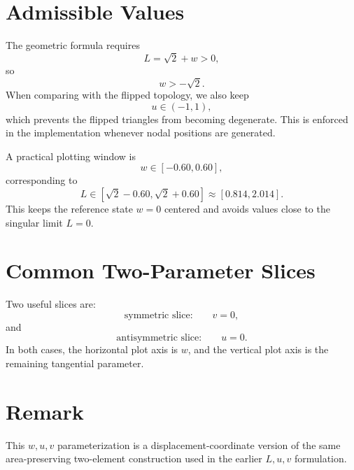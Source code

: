 \documentclass[11pt]{article}
\begin{document}
\section{Admissible Values}

The geometric formula requires
\[
    L=\sqrt{2}+w>0,
\]
so
\[
    w>-\sqrt{2}.
\]
When comparing with the flipped topology, we also keep
\[
    u\in(-1,1),
\]
which prevents the flipped triangles from becoming degenerate. This is enforced
in the implementation whenever nodal positions are generated.

A practical plotting window is
\[
    w\in[-0.60,0.60],
\]
corresponding to
\[
    L\in[\sqrt{2}-0.60,\sqrt{2}+0.60]
      \approx [0.814,2.014].
\]
This keeps the reference state \(w=0\) centered and avoids values close to the
singular limit \(L=0\).

\section{Common Two-Parameter Slices}

Two useful slices are:
\[
    \text{symmetric slice:} \qquad v=0,
\]
and
\[
    \text{antisymmetric slice:} \qquad u=0.
\]
In both cases, the horizontal plot axis is \(w\), and the vertical plot axis is
the remaining tangential parameter.

\section{Remark}

This \(w,u,v\) parameterization is a displacement-coordinate version of the
same area-preserving two-element construction used in the earlier \(L,u,v\)
formulation.
\end{document}

